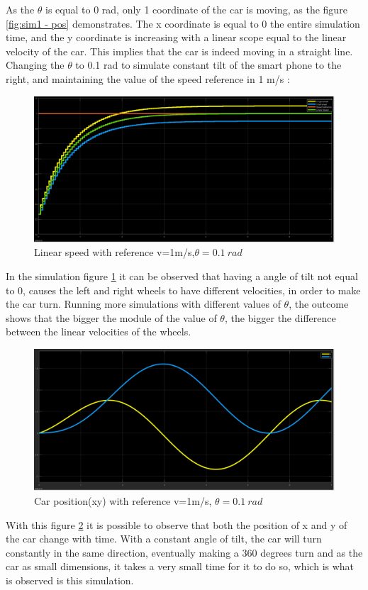 As the $\theta$ is equal to 0 rad, only 1 coordinate of the car is moving, as the figure \ref{fig:sim1 - pos} demonstrates. The x coordinate is equal to 0 the entire simulation time, and the y coordinate is increasing with a linear scope equal to the linear velocity of the car. This implies that the car is indeed moving in a straight line.\\
\newpage
Changing the $\theta$ to 0.1 rad to simulate constant tilt of the smart phone to the right, and maintaining the value of the speed reference in 1 m/s :\
\begin{figure}[!h]
\centering
\includegraphics[width=1.0\textwidth]{./img/vel101.png}
\caption {\label{fig:sim2 - vel}Linear speed with reference v=1m/s,$\theta = 0.1~\si{rad}$}
\end{figure}
In the simulation figure \ref{fig:sim2 - vel} it can be observed that having a angle of tilt not equal to 0, causes the left and right wheels to have different velocities, in order to make the car turn. Running more simulations with different values of $\theta$, the outcome shows that the bigger the module of the value of $\theta$, the bigger the difference between the linear velocities of the wheels.
\begin{figure}[!ht]
\centering
\includegraphics[width=1.0\textwidth]{./img/xy101.png}
\caption {\label{fig:sim2 - pos}Car position(xy) with reference v=1m/s, $\theta = 0.1~\si{rad}$}
\end{figure}
With this figure \ref{fig:sim2 - pos} it is possible to observe that both the
position of x and y of the car change with time. With a constant angle of tilt,
the car will turn constantly in the same direction, eventually making a 360
degrees turn and as the car as small dimensions, it takes a very small time for
it to do so, which is what is observed is this simulation.
